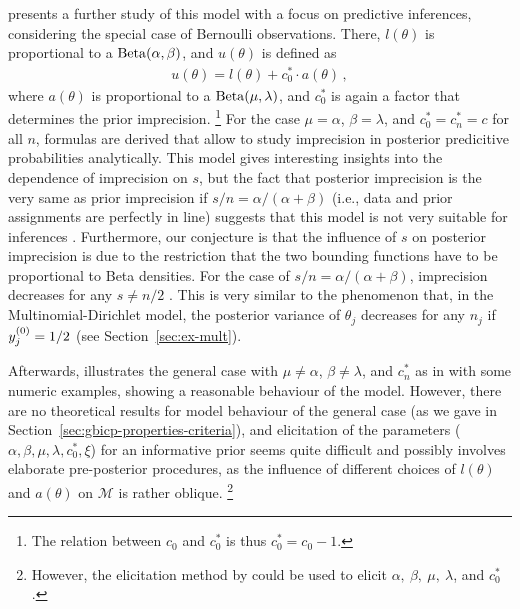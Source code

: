 \medskip

\textcite{1994:coolen} presents a further study of this model with a focus on predictive inferences,
considering the special case of Bernoulli observations.
There, $l(\theta)$ is proportional to a $\operatorname{Beta}(\alpha,\beta)$,
and $u(\theta)$ is defined as
\begin{align*}
u(\theta) = l(\theta) + c^*_0 \cdot a(\theta)\,,
\end{align*}
where $a(\theta)$ is proportional to a $\operatorname{Beta}(\mu,\lambda)$,
and $c^*_0$ is again a factor that determines the prior imprecision.%
\footnote{The relation between $c_0$ and $c^*_0$ is thus $c^*_0 = c_0 - 1$.}
For the case $\mu=\alpha$, $\beta=\lambda$, and $c^*_0 = c^*_n = c$ for all $n$,
formulas are derived that allow to study
imprecision in posterior predicitive probabilities analytically.
This model gives interesting insights into the dependence of imprecision on $s$,
but the fact that posterior imprecision is the very same as prior imprecision
if $s/n = \alpha/(\alpha+\beta)$ (i.e., data and prior assignments are perfectly in line)
suggests that this model is not very suitable for inferences \parencite[p.~160]{1994:coolen}.
Furthermore, our conjecture is that the influence of $s$ on posterior imprecision
is due to the restriction that the two bounding functions have to be
proportional to Beta densities. For the case of $s/n = \alpha/(\alpha+\beta)$,
imprecision decreases for any $s \neq n/2$ \parencite[Table~1]{1994:coolen}.
This is very similar to the phenomenon that, in the Multinomial-Dirichlet model,
the posterior variance of $\theta_j$ decreases for any $n_j$ if $y^{(0)}_j = 1/2$
(see Section~\ref{sec:ex-mult}).

Afterwards, \textcite[\S 4]{1994:coolen} illustrates the general case
with $\mu\neq\alpha$, $\beta\neq\lambda$, and $c^*_n$ as in \textcite{1993:coolen}
with some numeric examples, showing a reasonable behaviour of the model.
However, there are no theoretical results for model behaviour of the general case
(as we gave in Section~\ref{sec:gbicp-properties-criteria}),
and elicitation of the parameters ($\alpha,\beta,\mu,\lambda,c^*_0,\xi$)
for an informative prior
seems quite difficult and possibly involves elaborate pre-posterior procedures,
as the influence of different choices of $l(\theta)$ and $a(\theta)$ on $\mathcal{M}$
is rather oblique.%
\footnote{However, the elicitation method by \textcite{2011:rinderknecht} could be used
to elicit $\alpha,\ \beta,\ \mu,\ \lambda$, and $c^*_0$.}

\medskip


